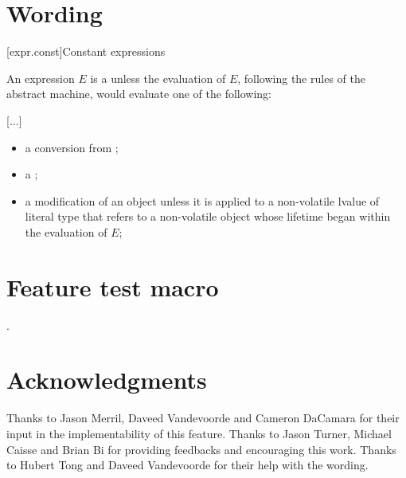 \documentclass{wg21}
\begin{document}
    \section{Wording}

    [expr.const]{Constant expressions}%

    \pnum
    An expression $E$ is a 
    unless the evaluation of $E$, following the rules of the abstract
    machine, would evaluate one of the following:

    \textcolor{noteclr}{[...]}
    \begin{itemize}
        \item
        a conversion from ;


    \item
    a ;

    \item
    a modification of an object
    unless it is applied to a non-volatile lvalue of literal type
    that refers to a non-volatile object
    whose lifetime began within the evaluation of $E$;

\end{itemize}

\section{Feature test macro}

.


\section{Acknowledgments}

Thanks to Jason Merril, Daveed Vandevoorde and Cameron DaCamara for their input in the implementability of this feature.
Thanks to Jason Turner,  Michael Caisse and Brian Bi for providing feedbacks and encouraging this work.
Thanks to Hubert Tong and Daveed Vandevoorde for their help with the wording.
\end{document}
